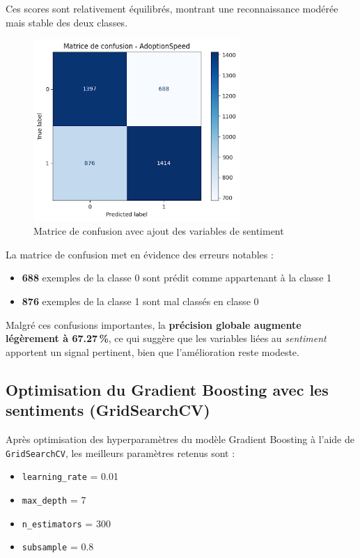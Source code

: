 \documentclass[a4paper,12pt]{article}
\begin{document}
Ces scores sont relativement équilibrés, montrant une reconnaissance modérée mais stable des deux classes.

\begin{figure}[H]
    \centering
    \includegraphics[width=0.7\textwidth]{image-matrice-confusion.png}
    \caption{Matrice de confusion avec ajout des variables de sentiment}
    \label{fig:matrice_sentiment}
\end{figure}

La matrice de confusion met en évidence des erreurs notables :
\begin{itemize}
    \item \textbf{688} exemples de la classe 0 sont prédit comme appartenant à la classe 1
    \item \textbf{876} exemples de la classe 1 sont mal classés en classe 0
\end{itemize}

Malgré ces confusions importantes, la \textbf{précision globale augmente légèrement à 67.27\,\%}, ce qui suggère que les variables liées au \textit{sentiment} apportent un signal pertinent, bien que l'amélioration reste modeste.


\subsection{Optimisation du Gradient Boosting avec les sentiments (GridSearchCV)}

Après optimisation des hyperparamètres du modèle Gradient Boosting à l’aide de \texttt{GridSearchCV}, les meilleurs paramètres retenus sont :
\begin{itemize}
    \item \texttt{learning\_rate} = 0.01
    \item \texttt{max\_depth} = 7
    \item \texttt{n\_estimators} = 300
    \item \texttt{subsample} = 0.8
\end{itemize}
\end{document}
